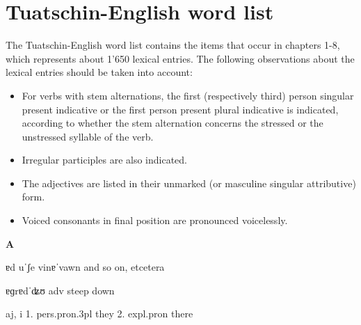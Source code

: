 \chapter{Tuatschin-English word list}
The Tuatschin-English word list contains the items that occur in chapters 1-8, which represents about 1'650 lexical entries. The following observations about the lexical entries should be taken into account:

\begin{itemize}
	\item For verbs with stem alternations, the first (respectively third) person singular present indicative or the first person present plural indicative is indicated, according to whether the stem alternation concerns the stressed or the unstressed syllable of the verb.
	\item Irregular participles are also indicated.
	\item The adjectives are listed in their unmarked (or masculine singular attributive) form.
	\item Voiced consonants in final position are pronounced voicelessly.
\end{itemize}

\bigskip
\textbf{A}
\bigskip







 {ɐd uˈʃe vinɐˈvawn} {and so on, etcetera}






 {ɐɡrɐdˈʥʊ} {adv} {steep down}


 {aj, i} {1.} {pers.pron.3pl} {they} {2.} {expl.pron} {there}


